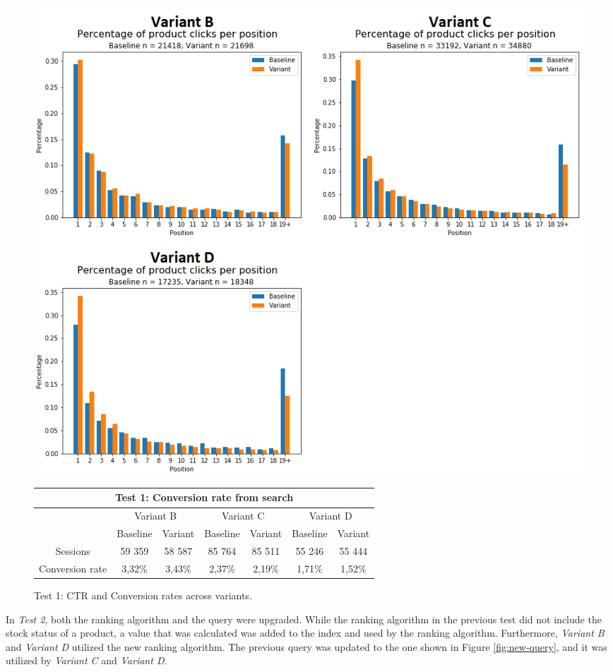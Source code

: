 \begin{figure}[p]
    \centering
    
    \includegraphics[width=\textwidth]{img/search_v1.png}

    \begin{tabular}{|c||c|c||c|c||c|c|}
    \hline
    \multicolumn{7}{|c|}{Test 1: Conversion rate from search} \\ \hline \hline
    & \multicolumn{2}{|c||}{Variant B} & \multicolumn{2}{|c||}{Variant C} & \multicolumn{2}{|c|}{Variant D} \\ \cline{2-7}
    & Baseline & Variant & Baseline & Variant & Baseline & Variant \\ \hline
    Sessions & 59 359 & 58 587 & 85 764 & 85 511 & 55 246 & 55 444 \\ \hline
    Conversion rate & 3,32\% & 3,43\% & 2,37\% & 2,19\% & 1,71\% & 1,52\% \\ \hline
    \end{tabular}

    \caption{Test 1: CTR and Conversion rates across variants.}
    \label{fig:search_v1}
\end{figure}



In \emph{Test 2}, both the ranking algorithm and the query were upgraded.
While the ranking algorithm in the previous test did not include the stock status of a product, a value
that was calculated was added to the index and used by the ranking algorithm.
Furthermore, \emph{Variant B} and \emph{Variant D} utilized the new ranking algorithm.
The previous query was updated to the one shown in Figure \ref{fig:new-query}, and it was
utilized by \emph{Variant C} and  \emph{Variant D}.

